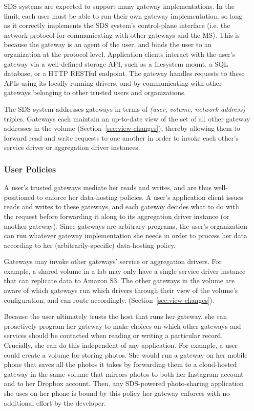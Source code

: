 SDS systems are expected to support many gateway implementations.  In the limit,
each user must be able to run their own gateway implementation, so long as it
correctly implements the SDS system's control-plane interface (i.e. the network protocol
for communicating with other gateways and the MS).  This is because
the gateway is an agent of the user, and binds the user to an organization at
the protocol level.  Application clients interact with the user's gateway via a
well-defined storage API, such as a filesystem mount, a SQL database, or a
HTTP RESTful endpoint.  The gateway handles requests to these APIs using its
locally-running drivers, and by communicating
with other gateways belonging to other trusted users and organizations.

The SDS system addresses gateways in terms of \textit{(user, volume,
network-address)} triples.  Gateways each maintain an up-to-date view of the set
of all other gateway addresses in the volume (Section~\ref{sec:view-changes}),
thereby allowing them to forward read and write requests to one another in order
to invoke each other's service driver or aggregation driver instances.

\subsubsection{User Policies}

A user's trusted gateways mediate her reads and writes, and are thus well-positioned to enforce her data-hosting
policies.  A user's application client issues reads and writes to these
gateways, and each gateway decides what to do with the request before
forwarding it along to its aggregation driver instance (or another gateway).
Since gateways are arbitrary programs, the user's organization can run whatever
gateway implementation she needs in order to process her data according to her
(arbitrarily-specific) data-hosting policy.

Gateways may invoke other gateways' service or aggregation drivers.  For
example, a shared volume in a lab may only have a single service driver instance
that can replicate data to Amazon S3.  The other gateways in the volume are
aware of which gateways run which drivers through their view of the volume's
configuration, and can route accordingly.
(Section~\ref{sec:view-changes}).

Because the user ultimately trusts the host that runs her gateway, she can
proactively program her gateway to make choices on which other gateways and
services should be contacted when reading or writing a particular record.
Crucially, she can do this independent of any application.  For example, a user
could create a volume for storing photos.  She would run
a gateway on her mobile phone that saves all the photos it takes
by forwarding them to a cloud-hosted gateway in the same volume
that mirrors photos to both her Instagram account and to her Dropbox account.
Then, any SDS-powered photo-sharing application she uses on her phone is bound
by this policy her gateway enforces with no additional effort by the developer.

